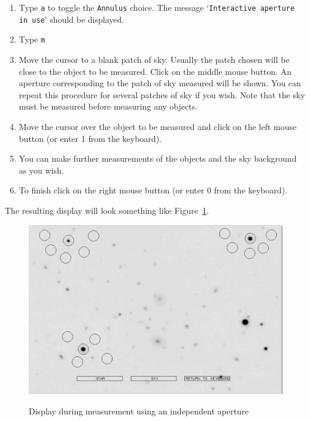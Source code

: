 \documentclass[twoside,11pt]{article}
\begin{document}
\begin{enumerate}
  \begin{enumerate}

    \item Type {\tt a} to toggle the {\tt Annulus} choice.  The message
     `{\tt Interactive aperture in use}' should be displayed.

    \item Type {\tt m}

    \item Move the cursor to a blank patch of sky.  Usually the patch
     chosen will be close to the object to be measured.  Click on the
     middle mouse button.  An aperture corresponding to the patch of
     sky measured will be shown.  You can repeat this procedure for
     several patches of sky if you wish.  Note that the sky must be
     measured before measuring any objects.

    \item Move the cursor over the object to be measured and click
     on the left mouse button (or enter 1 from the keyboard).

    \item You can make further measurements of the objects and the sky
     background as you wish.

    \item To finish click on the right mouse button (or enter 0 from
     the keyboard).

  \end{enumerate}

   The resulting display will look something like Figure~\ref{an2}.

  \begin{figure}[htbp]
     \centering
     \includegraphics[totalheight=3in]{sc6_ap2}
     \begin{quote}
     \caption{Display during measurement using an independent aperture
     \label{an2} }
     \end{quote}
  \end{figure}


\end{enumerate}
\end{document}
